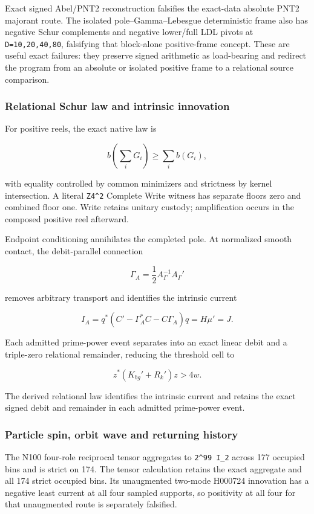 Exact signed Abel/PNT2 reconstruction falsifies the exact-data absolute
PNT2 majorant route. The isolated pole--Gamma--Lebesgue deterministic
frame also has negative Schur complements and negative lower/full LDL
pivots at \texttt{D=10,20,40,80}, falsifying that block-alone
positive-frame concept. These are useful exact failures: they preserve
signed arithmetic as load-bearing and redirect the program from an
absolute or isolated positive frame to a relational source comparison.

\subsubsection{Relational Schur law and intrinsic
innovation}\label{viii-ch09-relational-schur-law-and-intrinsic-innovation}

For positive reels, the exact native law is

\[
b\!\left(\sum_iG_i\right)\geq\sum_i b(G_i),
\]

with equality controlled by common minimizers and strictness by kernel
intersection. A literal \texttt{Z4\^{}2} Complete Write witness has
separate floors zero and combined floor one. Write retains unitary
custody; amplification occurs in the composed positive reel afterward.

Endpoint conditioning annihilates the completed pole. At normalized
smooth contact, the debit-parallel connection

\[
\Gamma_A=\frac12A_\Gamma^{-1}A_\Gamma'
\]

removes arbitrary transport and identifies the intrinsic current

\[
I_A=q^*(C'-\Gamma_A^*C-C\Gamma_A)q=H\mu'=J.
\]

Each admitted prime-power event separates into an exact linear debit and
a triple-zero relational remainder, reducing the threshold cell to

\[
z^*(K_{bg}'+R_k')z>4w.
\]

The derived relational law identifies the intrinsic current and retains the exact signed debit and remainder in each admitted prime-power event.

\subsubsection{Particle spin, orbit wave and returning
history}\label{viii-ch09-particle-spin-orbit-wave-and-returning-history}

The N100 four-role reciprocal tensor aggregates to
\texttt{2\^{}99\ I\_2} across 177 occupied bins and is strict on 174.
The tensor calculation retains the exact aggregate and all 174 strict occupied bins. Its unaugmented two-mode
H000724 innovation has a negative least current at all four sampled
supports, so positivity at all four for that unaugmented route is
separately falsified.

